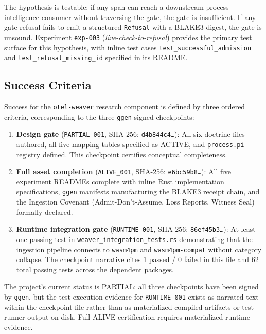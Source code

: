The hypothesis is testable: if any span can reach a downstream process-intelligence consumer
without traversing the gate, the gate is insufficient. If any gate refusal fails to emit a
structured \texttt{Refusal} with a BLAKE3 digest, the gate is unsound. Experiment \texttt{exp-003}
(\textit{live-check-to-refusal}) provides the primary test surface for this hypothesis, with
inline test cases \texttt{test\_successful\_admission} and \texttt{test\_refusal\_missing\_id}
specified in its README.

\subsection{Success Criteria}
\label{sec:otel-weaver-rq-success}

Success for the \texttt{otel-weaver} research component is defined by three ordered criteria,
corresponding to the three \texttt{ggen}-signed checkpoints:

\begin{enumerate}
  \item \textbf{Design gate} (\texttt{PARTIAL\_001}, SHA-256: \texttt{d4b844c4\ldots}):
    All six doctrine files authored, all five mapping tables specified as ACTIVE, and
    \texttt{process.pi} registry defined. This checkpoint certifies conceptual completeness.
  \item \textbf{Full asset completion} (\texttt{ALIVE\_001}, SHA-256: \texttt{e6bc59b8\ldots}):
    All five experiment READMEs complete with inline Rust implementation specifications,
    \texttt{ggen} manifests manufacturing the BLAKE3 receipt chain, and the Ingestion Covenant
    (Admit-Don't-Assume, Loss Reports, Witness Seal) formally declared.
  \item \textbf{Runtime integration gate} (\texttt{RUNTIME\_001}, SHA-256: \texttt{86ef45b3\ldots}):
    At least one passing test in \texttt{weaver\_integration\_tests.rs} demonstrating that the
    ingestion pipeline connects to \texttt{wasm4pm} and \texttt{wasm4pm-compat} without
    category collapse. The checkpoint narrative cites 1 passed / 0 failed in this file and
    62 total passing tests across the dependent packages.
\end{enumerate}

The project's current status is PARTIAL: all three checkpoints have been signed by \texttt{ggen},
but the test execution evidence for \texttt{RUNTIME\_001} exists as narrated text within the
checkpoint file rather than as materialized compiled artifacts or test runner output on disk.
Full ALIVE certification requires materialized runtime evidence.
